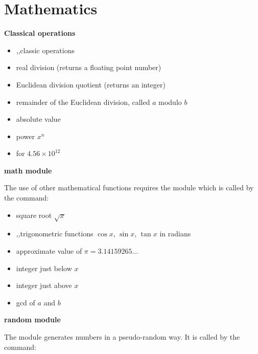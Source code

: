 \documentclass[11pt,class=report,crop=false]{standalone}
\begin{document}


\section{Mathematics}

\textbf{Classical operations}
\begin{itemize}
  \item {},\quad{},\quad{}\quad classic operations
  \item {}\quad \og{}real\fg{} division (returns a floating point number)
  \item {}\quad Euclidean division quotient (returns an integer)
  \item {}\quad remainder of the Euclidean division, called $a$ modulo $b$
  \item {}\quad absolute value
  \item {}\quad power $x^n$
  \item {}\quad for $4.56 \times 10^{12}$
\end{itemize}

\bigskip

\textbf{\og{}math\fg{} module}

The use of other mathematical functions requires the  module which is called by the command:

\begin{itemize}
  \item {}\quad square root $\sqrt{x}$
  \item {},\quad{},\quad{}\quad trigonometric functions $\cos x$, $\sin x$, $\tan x$ in radians
  \item {}\quad approximate value of $\pi = 3.14159265\ldots$
  \item {}\quad integer just below $x$
  \item {}\quad integer just above $x$
  \item {}\quad gcd of $a$ and $b$
 \end{itemize}
 \bigskip

\textbf{\og{}random\fg{} module}

The  module generates numbers in a pseudo-random way. It is called by the command:
\end{document}
